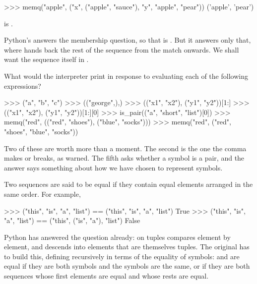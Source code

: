 \begin{codeBlock}
>>> memq("apple", ("x", ("apple", "sauce"), "y", "apple", "pear"))
('apple', 'pear')
\end{codeBlock}

\noindent
is .

Python's  answers the membership question, so that  is .  But it answers only that, where
 hands back the rest of the sequence from the match onwards.  We
shall want the sequence itself in .

\begin{exerciseGroup}
\label{Exercise 2.53}
 What would the interpreter print
in response to evaluating each of the following expressions?

\begin{codeBlock}
>>> ("a", "b", "c")
>>> (("george",),)
>>> (("x1", "x2"), ("y1", "y2"))[1:]
>>> (("x1", "x2"), ("y1", "y2"))[1:][0]
>>> is_pair(("a", "short", "list")[0])
>>> memq("red", (("red", "shoes"), ("blue", "socks")))
>>> memq("red", ("red", "shoes", "blue", "socks"))
\end{codeBlock}

Two of these are worth more than a moment.  The second is the one the comma
makes or breaks, as  warned.  The fifth asks whether a
symbol is a pair, and the answer says something about how we have chosen to
represent symbols.

\label{Exercise 2.54}
 Two sequences are said to be
equal if they contain equal elements arranged in the same order.  For example,

\begin{codeBlock}
>>> ("this", "is", "a", "list") == ("this", "is", "a", "list")
True
>>> ("this", "is", "a", "list") == ("this", ("is", "a"), "list")
False
\end{codeBlock}

\noindent
Python has answered the question already: \code{==} on tuples compares element
by element, and descends into elements that are themselves tuples.  The
original has to build this, defining  recursively in terms of the
 equality of symbols:  and  are equal if they are
both symbols and the symbols are the same, or if they are both sequences whose
first elements are equal and whose rests are equal.


\end{exerciseGroup}
